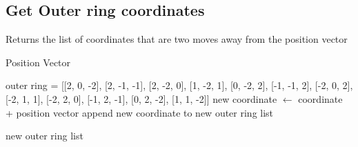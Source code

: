 \subsection{Get Outer ring coordinates}
\label{function:def_outer_ring}
\begin{algorithm}[H]
\caption{Returns the list of coordinates that are two moves away from the position vector}
\begin{algorithmic}

\REQUIRE Position Vector

outer ring = [[2, 0, -2], [2, -1, -1],
                      [2, -2, 0], [1, -2, 1],
                      [0, -2, 2], [-1, -1, 2],
                      [-2, 0, 2], [-2, 1, 1],
                      [-2, 2, 0], [-1, 2, -1],
                      [0, 2, -2], [1, 1, -2]]
\STATE new coordinate $\leftarrow$ coordinate + position vector
\STATE append new coordinate to new outer ring list

\ENDFOR
\RETURN new outer ring list
\end{algorithmic}
\end{algorithm}




